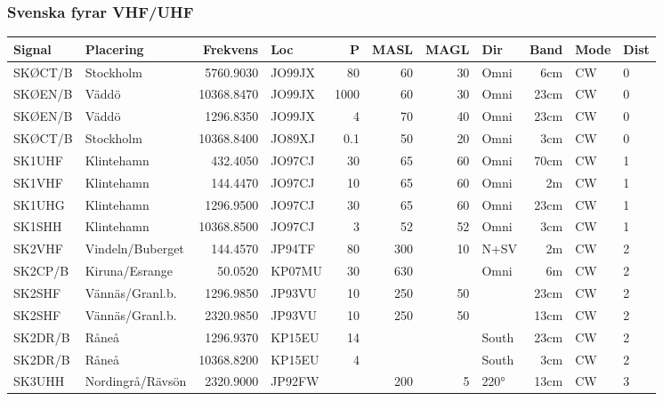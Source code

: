 \subsubsection{Svenska fyrar VHF/UHF}
\begin{longtable}{llrlrrrlrll}
	Signal   & Placering           &   Frekvens & Loc    &    P & MASL & MAGL & Dir     &  Band & Mode   & Dist \\ \hline
	SKØCT/B  & Stockholm           &  5760.9030 & JO99JX &   80 &   60 &   30 & Omni    &   6cm & CW     & 0    \\
	SKØEN/B  & Väddö               & 10368.8470 & JO99JX & 1000 &   60 &   30 & Omni    &  23cm & CW     & 0    \\
	SKØEN/B  & Väddö               &  1296.8350 & JO99JX &    4 &   70 &   40 & Omni    &  23cm & CW     & 0    \\
	SKØCT/B  & Stockholm           & 10368.8400 & JO89XJ &  0.1 &   50 &   20 & Omni    &   3cm & CW     & 0    \\
	SK1UHF   & Klintehamn          &   432.4050 & JO97CJ &   30 &   65 &   60 & Omni    &  70cm & CW     & 1    \\
	SK1VHF   & Klintehamn          &   144.4470 & JO97CJ &   10 &   65 &   60 & Omni    &    2m & CW     & 1    \\
	SK1UHG   & Klintehamn          &  1296.9500 & JO97CJ &   30 &   65 &   60 & Omni    &  23cm & CW     & 1    \\
	SK1SHH   & Klintehamn          & 10368.8500 & JO97CJ &    3 &   52 &   52 & Omni    &   3cm & CW     & 1    \\
	SK2VHF   & Vindeln/Buberget    &   144.4570 & JP94TF &   80 &  300 &   10 & N+SV    &    2m & CW     & 2    \\
	SK2CP/B  & Kiruna/Esrange      &    50.0520 & KP07MU &   30 &  630 &      & Omni    &    6m & CW     & 2    \\
	SK2SHF   & Vännäs/Granl.b.     &  1296.9850 & JP93VU &   10 &  250 &   50 &         &  23cm & CW     & 2    \\
	SK2SHF   & Vännäs/Granl.b.     &  2320.9850 & JP93VU &   10 &  250 &   50 &         &  13cm & CW     & 2    \\
	SK2DR/B  & Råneå               &  1296.9370 & KP15EU &   14 &      &      & South   &  23cm & CW     & 2    \\
	SK2DR/B  & Råneå               & 10368.8200 & KP15EU &    4 &      &      & South   &   3cm & CW     & 2    \\
	SK3UHH   & Nordingrå/Rävsön    &  2320.9000 & JP92FW &      &  200 &    5 & 220°    &  13cm & CW     & 3    \\

\end{longtable}
